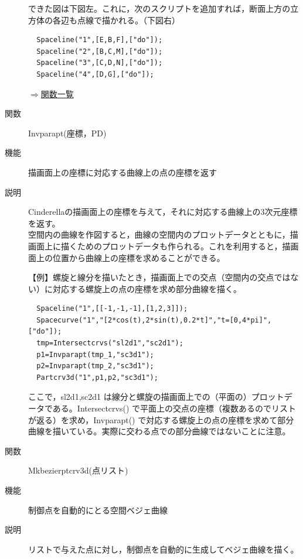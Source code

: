 \documentclass[papersize,a4paper,12pt,uplatex]{jsarticle}
\begin{document}
\begin{description}
できた図は下図左。これに，次のスクリプトを追加すれば，断面上方の立方体の各辺も点線で描かれる。（下図右）
\begin{verbatim}
  Spaceline("1",[E,B,F],["do"]);
  Spaceline("2",[B,C,M],["do"]);
  Spaceline("3",[C,D,N],["do"]);
  Spaceline("4",[D,G],["do"]);
\end{verbatim}
\begin{center}      \end{center}

\begin{flushright} \hyperlink{functionlist}{$\Rightarrow$関数一覧}\end{flushright}

\hypertarget{invparapt}{}
\item[関数]  Invparapt(座標，PD)
\item[機能]  描画面上の座標に対応する曲線上の点の座標を返す
\item[説明]  Cinderellaの描画面上の座標を与えて，それに対応する曲線上の3次元座標を返す。
\\
空間内の曲線を作図すると，曲線の空間内のプロットデータとともに，描画面上に描くためのプロットデータも作られる。これを利用すると，描画面上の位置から曲線上の座標を求めることができる。

\vspace{\baselineskip}
【例】螺旋と線分を描いたとき，描画面上での交点（空間内の交点ではない）に対応する螺旋上の点の座標を求め部分曲線を描く。

\begin{verbatim}
  Spaceline("1",[[-1,-1,-1],[1,2,3]]);
  Spacecurve("1","[2*cos(t),2*sin(t),0.2*t]","t=[0,4*pi]",["do"]);
  tmp=Intersectcrvs("sl2d1","sc2d1");
  p1=Invparapt(tmp_1,"sc3d1");
  p2=Invparapt(tmp_2,"sc3d1");
  Partcrv3d("1",p1,p2,"sc3d1"); 
\end{verbatim}
 \begin{center}  \end{center}
 
ここで，sl2d1,sc2d1 は線分と螺旋の描画面上での（平面の）プロットデータである。Intersectcrvs() で平面上の交点の座標（複数あるのでリストが返る）を求め，Invparapt() で対応する螺旋上の点の座標を求めて部分曲線を描いている。実際に交わる点での部分曲線ではないことに注意。

\vspace{\baselineskip}
\hypertarget{mkbezierptcrv3d}{}
\item[関数]  Mkbezierptcrv3d(点リスト)
\item[機能]  制御点を自動的にとる空間ベジェ曲線
\item[説明]  リストで与えた点に対し，制御点を自動的に生成してベジェ曲線を描く。


\end{description}
\end{document}
